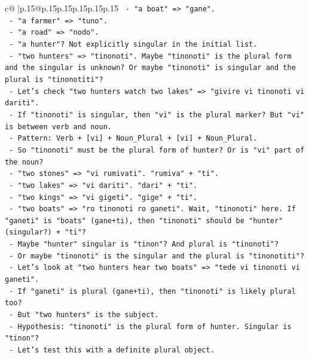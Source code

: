 \documentclass{article}
\begin{document}
{\begin{supertabular}{c@{$\;$}|p{.15\linewidth}@{}p{.15\linewidth}p{.15\linewidth}p{.15\linewidth}p{.15\linewidth}p{.15\linewidth}}
{{{\texttt{          {-} "a boat" => "gane".} \\
\texttt{          {-} "a farmer" => "tuno".} \\
\texttt{          {-} "a road" => "nodo".} \\
\texttt{          {-} "a hunter"? Not explicitly singular in the initial list.} \\
\texttt{          {-} "two hunters" => "tinonoti". Maybe "tinonoti" is the plural form and the singular is unknown? Or maybe "tinonoti" is singular and the plural is "tinonotiti"?} \\
\texttt{          {-} Let's check "two hunters watch two lakes" => "givire vi tinonoti vi dariti".} \\
\texttt{          {-} If "tinonoti" is singular, then "vi" is the plural marker? But "vi" is between verb and noun.} \\
\texttt{          {-} Pattern: Verb + {[}vi{]} + Noun\_Plural + {[}vi{]} + Noun\_Plural.} \\
\texttt{          {-} So "tinonoti" must be the plural form of hunter? Or is "vi" part of the noun?} \\
\texttt{          {-} "two stones" => "vi rumivati". "rumiva" + "ti".} \\
\texttt{          {-} "two lakes" => "vi dariti". "dari" + "ti".} \\
\texttt{          {-} "two kings" => "vi gigeti". "gige" + "ti".} \\
\texttt{          {-} "two boats" => "ro tinonoti ro ganeti". Wait, "tinonoti" here. If "ganeti" is "boats" (gane+ti), then "tinonoti" should be "hunter" (singular?) + "ti"?} \\
\texttt{          {-} Maybe "hunter" singular is "tinon"? And plural is "tinonoti"?} \\
\texttt{          {-} Or maybe "tinonoti" is the singular and the plural is "tinonotiti"?} \\
\texttt{          {-} Let's look at "two hunters hear two boats" => "tede vi tinonoti vi ganeti".} \\
\texttt{          {-} If "ganeti" is plural (gane+ti), then "tinonoti" is likely plural too?} \\
\texttt{          {-} But "two hunters" is the subject.} \\
\texttt{          {-} Hypothesis: "tinonoti" is the plural form of hunter. Singular is "tinon"?} \\
\texttt{          {-} Let's test this with a definite plural object.} \\
}}}
\end{supertabular}}
\end{document}
